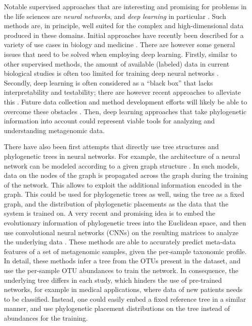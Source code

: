 Notable supervised approaches that are interesting and promising for problems in the life sciences
are \emph{neural networks}, and \emph{deep learning} in particular \cite{Skansi2018}.
Such methods are, in principle, well suited for the complex and high-dimensional data produced in these domains.
Initial approaches have recently been described
for a variety of use cases in biology and medicine \cite{Mamoshina2016,Min2017,Ching2018}.
There are however some general issues that need to be solved when employing deep learning.
Firstly, similar to other supervised methods, the amount of available (labeled) data in current biological studies
is often too limited for training deep neural networks \cite{Min2017,Ching2018}.
Secondly, deep learning is often considered as a ``black box'' that lacks interpretability and testability;
there are however recent approaches to alleviate this \cite{Min2017,Reiman2018,Wainberg2018}.
Future data collection and method development efforts will likely be able to overcome these obstacles \cite{Wainberg2018}.
Then, deep learning approaches that take phylogenetic information into account
could represent viable tools for analyzing and understanding metagenomic data.

There have also been first attempts that directly use tree structures and phylogenetic trees in neural networks.
For example, the architecture of a neural network can be modeled
according to a given graph structure \cite{Scarselli2009,Bronstein2017}.
In such models, data on the nodes of the graph is propagated across the graph during the training of the network.
This allows to exploit the additional information encoded in the graph.
This could be used for phylogenetic trees as well, using the tree as a fixed graph,
and the distribution of phylogenetic placements as the data that the system is trained on.
A very recent and promising idea is to embed the evolutionary information of phylogenetic trees into the Euclidean space,
and then use convolutional neural networks (CNNs) on the resulting matrices
to analyze the underlying data \cite{Fioravanti2018,Reiman2017,Reiman2018}.
These methods are able to accurately predict meta-data features of a set of metagenomic samples,
given the per-sample taxonomic profile.
In detail, these methods infer a tree from the OTUs present in the dataset,
and use the per-sample OTU abundances to train the network.
In consequence, the underlying tree differs in each study, which hinders the use of pre-trained networks,
for example in medical applications, where data of new patients needs to be classified.
Instead, one could easily embed a fixed reference tree in a similar manner,
and use phylogenetic placement distributions on the tree instead of abundances for the training.


